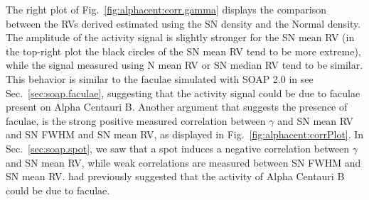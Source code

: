 \documentclass{aa}
\begin{document}
The right plot of Fig.~\ref{fig:alphacent:corr.gamma} displays the comparison between the RVs derived estimated using the SN density and the Normal density. 
The amplitude of the activity signal is slightly stronger for the SN mean RV (in the top-right plot the black circles of the SN mean RV tend to be more extreme), while the signal measured using N mean RV or SN median RV tend to be similar. 
This behavior is similar to the faculae simulated with SOAP 2.0 in see Sec.~\ref{sec:soap.faculae}, suggesting that the activity signal could be due to faculae present on Alpha Centauri B. Another argument that suggests the presence of faculae, is the strong positive measured correlation between $\gamma$ and SN mean RV and SN FWHM and SN mean RV, as displayed in Fig.~\ref{fig:alphacent:corrPlot}. In Sec.~\ref{sec:soap.spot}, we saw that a spot induces a negative correlation between $\gamma$ and SN mean RV, while weak correlations are measured between SN FWHM and SN mean RV.
\citet{Dumusque-2014c} had previously suggested that the activity of Alpha Centauri B could be due to faculae.
%
\end{document}
